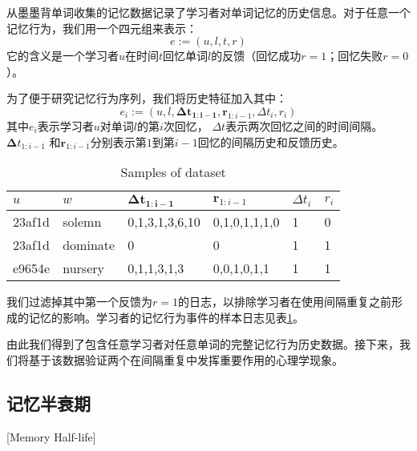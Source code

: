 从墨墨背单词收集的记忆数据记录了学习者对单词记忆的历史信息。对于任意一个记忆行为，我们用一个四元组来表示：
\begin{equation}
e :=(u, l, t, r)
\end{equation}
它的含义是一个学习者$u$在时间$t$回忆单词$l$的反馈（回忆成功$r=1$；回忆失败$r=0$）。

为了便于研究记忆行为序列，我们将历史特征加入其中：
\begin{equation}
e_{i} :=(u, l, \bm{\Delta t_{1:i-1}}, \bm r_{1:i-1} , \Delta t_i , r_i)
\end{equation}
其中$e_i$表示学习者$u$对单词$l$的第$i$次回忆， $\Delta t$表示两次回忆之间的时间间隔。 $\bm \Delta t_{1:i-1}$  和$\bm r_{1:i-1}$分别表示第$1$到第$i-1$回忆的间隔历史和反馈历史。

\begin{table}[htbp]
    \caption{Samples of dataset}
    \label{tab:raw}
    \vspace{0.5em}\centering\wuhao
    \begin{tabular}{llllll}
    \toprule[1.5pt]
    $u$    & $w$      & $\bm{\Delta t_{1:i-1}}$ & $\bm r_{1:i-1}$ & $\Delta t_i$ & $r_i$ \\ 
    \midrule[1pt]
    23af1d & solemn   & 0,1,3,1,3,6,10                  & 0,1,0,1,1,1,0           & 1            & 0 \\
    23af1d & dominate & 0                               & 0                       & 1            & 1 \\
    e9654e & nursery  & 0,1,1,3,1,3                     & 0,0,1,0,1,1             & 1            & 1 \\ \bottomrule[1.5pt]
    \end{tabular}
\end{table}

我们过滤掉其中第一个反馈为$r=1$的日志，以排除学习者在使用间隔重复之前形成的记忆的影响。学习者的记忆行为事件的样本日志见表\ref{tab:raw}。

由此我们得到了包含任意学习者对任意单词的完整记忆行为历史数据。接下来，我们将基于该数据验证两个在间隔重复中发挥重要作用的心理学现象。

\subsection{记忆半衰期}[Memory Half-life]

